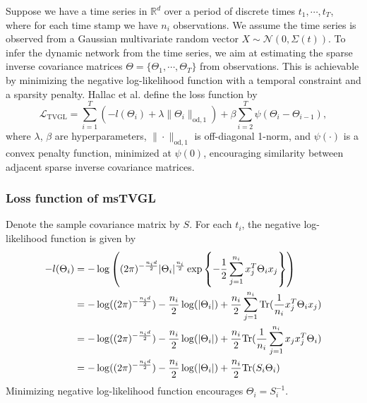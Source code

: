 Suppose we have a time series in $\mathbb{R}^d$ over a period of discrete times $t_1,\cdots,t_T$, 
where for each time stamp we have $n_i$ observations. 
We assume the time series is observed from a Gaussian multivariate random vector $X\sim\mathcal{N}(0,\Sigma(t))$. 
To infer the dynamic network from the time series, 
we aim at estimating the sparse inverse covariance matrices $\Theta=\{\Theta_1,\cdots,\Theta_T\}$ from observations. 
This is achievable by minimizing the negative log-likelihood function with a temporal constraint and a sparsity penalty.
Hallac et al. define the loss function by
\begin{equation*}
    \mathcal{L}_{\text{TVGL}} = \sum_{i=1}^{T}\left(-l(\Theta_i) + \lambda\|\Theta_i\|_{\text{od}, 1}\right) + \beta\sum_{i=2}^{T}\psi(\Theta_i-\Theta_{i-1}), 
\end{equation*}
where $\lambda$, $\beta$ are hyperparameters, $\|\cdot\|_{\text{od}, 1}$ is off-diagonal 1-norm, 
and $\psi(\cdot)$ is a convex penalty function, minimized at $\psi(0)$, 
encouraging similarity between adjacent sparse inverse covariance matrices. 

\subsubsection{Loss function of msTVGL}
Denote the sample covariance matrix by $S$. 
For each $t_i$, the negative log-likelihood function is given by 
\begin{align}
    \label{eq: ch1_loss}
    -l(\Theta_i) &= -\log\left((2\pi)^{-\frac{n_id}{2}}|\Theta_i|^{\frac{n_i}{2}}\exp\left\{-\frac{1}{2}\sum_{j=1}^{n_i}x_j^T\Theta_ix_j\right\}\right) \notag \\
               &= -\log((2\pi)^{-\frac{n_id}{2}}) - \frac{n_i}{2}\log(|\Theta_i|) +\frac{n_i}{2}\sum_{j=1}^{n_i}\text{Tr}(\frac{1}{n_i}x_j^T\Theta_ix_j) \notag \\
               &= -\log((2\pi)^{-\frac{n_id}{2}}) - \frac{n_i}{2}\log(|\Theta_i|) +\frac{n_i}{2}\text{Tr}(\frac{1}{n_i}\sum_{j=1}^{n_i}x_jx_j^T\Theta_i) \notag \\
               &= -\log((2\pi)^{-\frac{n_id}{2}}) - \frac{n_i}{2}\log(|\Theta_i|) +\frac{n_i}{2}\text{Tr}(S_i\Theta_i)
\end{align}
Minimizing negative log-likelihood function encourages $\Theta_i=S_i^{-1}$. 

